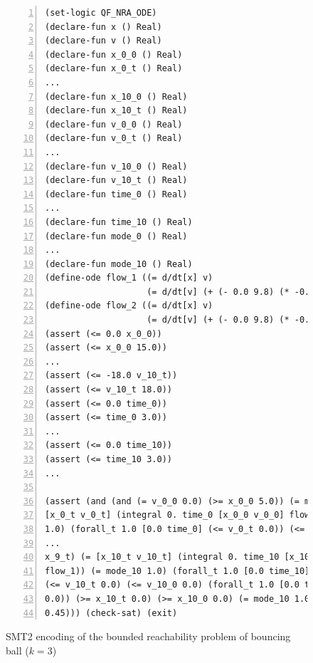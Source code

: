 \begin{figure}[!h]
  \centering
  \begin{Verbatim}[fontfamily=courier, frame=single, framesep=1mm,
  numbers=left, fontsize=\scriptsize]
(set-logic QF_NRA_ODE)
(declare-fun x () Real)
(declare-fun v () Real)
(declare-fun x_0_0 () Real)
(declare-fun x_0_t () Real)
...
(declare-fun x_10_0 () Real)
(declare-fun x_10_t () Real)
(declare-fun v_0_0 () Real)
(declare-fun v_0_t () Real)
...
(declare-fun v_10_0 () Real)
(declare-fun v_10_t () Real)
(declare-fun time_0 () Real)
...
(declare-fun time_10 () Real)
(declare-fun mode_0 () Real)
...
(declare-fun mode_10 () Real)
(define-ode flow_1 ((= d/dt[x] v)
                    (= d/dt[v] (+ (- 0.0 9.8) (* -0.45 (^ v 1.0))))))
(define-ode flow_2 ((= d/dt[x] v)
                    (= d/dt[v] (+ (- 0.0 9.8) (* -0.45 (^ v 1.0))))))
(assert (<= 0.0 x_0_0))
(assert (<= x_0_0 15.0))
...
(assert (<= -18.0 v_10_t))
(assert (<= v_10_t 18.0))
(assert (<= 0.0 time_0))
(assert (<= time_0 3.0))
...
(assert (<= 0.0 time_10))
(assert (<= time_10 3.0))
...

(assert (and (and (= v_0_0 0.0) (>= x_0_0 5.0)) (= mode_0 1.0) (=
[x_0_t v_0_t] (integral 0. time_0 [x_0_0 v_0_0] flow_1)) (= mode_0
1.0) (forall_t 1.0 [0.0 time_0] (<= v_0_t 0.0)) (<= v_0_t 0.0) (<=
...
x_9_t) (= [x_10_t v_10_t] (integral 0. time_10 [x_10_0 v_10_0]
flow_1)) (= mode_10 1.0) (forall_t 1.0 [0.0 time_10] (<= v_10_t 0.0))
(<= v_10_t 0.0) (<= v_10_0 0.0) (forall_t 1.0 [0.0 time_10] (>= x_10_t
0.0)) (>= x_10_t 0.0) (>= x_10_0 0.0) (= mode_10 1.0) (>= x_10_t
0.45))) (check-sat) (exit)
\end{Verbatim}
  \caption{SMT2 encoding of the bounded reachability problem of
    bouncing ball ($k = 3$) }
  \label{fig:bouncing-ball-smt2}
\end{figure}

